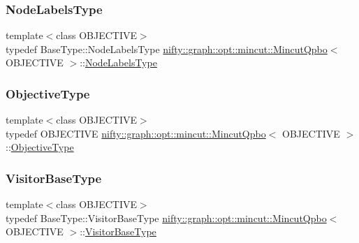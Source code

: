 \subsubsection{\texorpdfstring{Node\+Labels\+Type}{NodeLabelsType}}
{\footnotesize\ttfamily template$<$class O\+B\+J\+E\+C\+T\+I\+VE$>$ \\
typedef Base\+Type\+::\+Node\+Labels\+Type \hyperlink{classnifty_1_1graph_1_1opt_1_1mincut_1_1MincutQpbo}{nifty\+::graph\+::opt\+::mincut\+::\+Mincut\+Qpbo}$<$ O\+B\+J\+E\+C\+T\+I\+VE $>$\+::\hyperlink{classnifty_1_1graph_1_1opt_1_1mincut_1_1MincutQpbo_ac4034e26807b6dd2ec740c8716f89ad8}{Node\+Labels\+Type}}

\mbox{\label{classnifty_1_1graph_1_1opt_1_1mincut_1_1MincutQpbo_ac598cbbe660ac111ee5af88095d4b6e7}} 
\subsubsection{\texorpdfstring{Objective\+Type}{ObjectiveType}}
{\footnotesize\ttfamily template$<$class O\+B\+J\+E\+C\+T\+I\+VE$>$ \\
typedef O\+B\+J\+E\+C\+T\+I\+VE \hyperlink{classnifty_1_1graph_1_1opt_1_1mincut_1_1MincutQpbo}{nifty\+::graph\+::opt\+::mincut\+::\+Mincut\+Qpbo}$<$ O\+B\+J\+E\+C\+T\+I\+VE $>$\+::\hyperlink{classnifty_1_1graph_1_1opt_1_1mincut_1_1MincutQpbo_ac598cbbe660ac111ee5af88095d4b6e7}{Objective\+Type}}

\mbox{\label{classnifty_1_1graph_1_1opt_1_1mincut_1_1MincutQpbo_a1233aed5d95f3549018cabfb2f5c51c3}} 
\subsubsection{\texorpdfstring{Visitor\+Base\+Type}{VisitorBaseType}}
{\footnotesize\ttfamily template$<$class O\+B\+J\+E\+C\+T\+I\+VE$>$ \\
typedef Base\+Type\+::\+Visitor\+Base\+Type \hyperlink{classnifty_1_1graph_1_1opt_1_1mincut_1_1MincutQpbo}{nifty\+::graph\+::opt\+::mincut\+::\+Mincut\+Qpbo}$<$ O\+B\+J\+E\+C\+T\+I\+VE $>$\+::\hyperlink{classnifty_1_1graph_1_1opt_1_1mincut_1_1MincutQpbo_a1233aed5d95f3549018cabfb2f5c51c3}{Visitor\+Base\+Type}}

